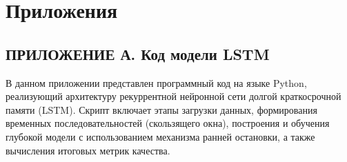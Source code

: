 \chapter*{Приложения}
\renewcommand{\thesection}{\Asbuk{section}}
\setcounter{section}{0}

\section*{ПРИЛОЖЕНИЕ А. Код модели LSTM}
\label{app:lstm}

В данном приложении представлен программный код на языке Python, реализующий архитектуру рекуррентной нейронной сети долгой краткосрочной памяти (LSTM). Скрипт включает этапы загрузки данных, формирования временных последовательностей (скользящего окна), построения и обучения глубокой модели с использованием механизма ранней остановки, а также вычисления итоговых метрик качества.

